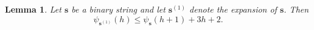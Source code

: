 \documentclass[11pt]{article}
\newtheorem{ex}{Example}
\newtheorem{lemma}{Lemma}
\begin{document}


\begin{lemma}\label{MainLemma}
Let $\mathbf{s}$ be a binary string and let $\mathbf{s}^{(1)}$ denote the expansion of $\mathbf{s}$. Then 
\begin{equation}
    \psi_{\mathbf{s}^{(1)}}(h) \le \psi_{\mathbf{s}}(h+1) + 3h + 2. 
\end{equation}

\end{lemma}
\end{document}
